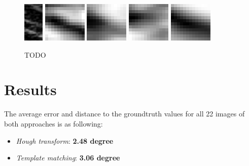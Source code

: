 \documentclass[10pt,twocolumn,letterpaper]{article}
\begin{document}
\begin{figure}
	\begin{center}		
		\includegraphics[width=0.09\linewidth]{img/sample}
		\hspace{0.05\linewidth}
		\includegraphics[width=0.2\linewidth]{img/diff1}
		\includegraphics[width=0.2\linewidth]{img/diff2}
		\includegraphics[width=0.2\linewidth]{img/diff3}
		\includegraphics[width=0.2\linewidth]{img/diff4}
	\end{center}
	\caption{TODO}
	\label{fig:sampleAndSimScores}
	
\end{figure}


\section{Results}
The average error and distance to the groundtruth values for all 22 images of both approaches is as following: 

\begin{itemize}
     \item \emph{Hough transform}: \textbf{2.48 degree}
     \item \emph{Template matching}: \textbf{3.06 degree}
\end{itemize}
\end{document}
